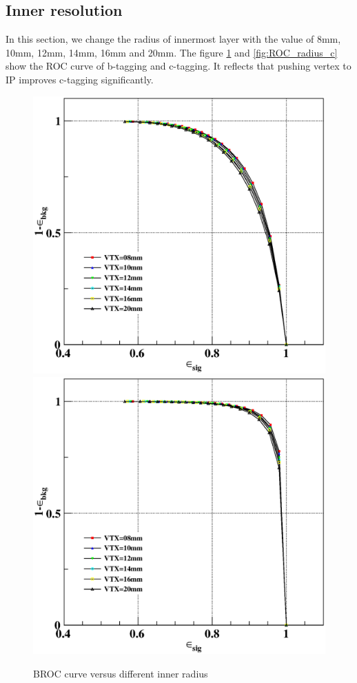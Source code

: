 \documentclass[usetikz]{style/cepcnote}
\begin{document}
\subsection{Inner resolution}

In this section, we change the radius of innermost layer with the value of 8mm, 10mm, 12mm, 14mm, 16mm and 20mm. 
The figure \ref{fig:ROC_radius_b} and \ref{fig:ROC_radius_c} show the ROC curve of b-tagging and c-tagging. It reflects that pushing vertex to IP improves c-tagging significantly.
\begin{figure}[!ht]
	\centering
	\includegraphics[scale=0.35]{figures/radius/plot6ROC-cbkg-bjet.eps}
	\includegraphics[scale=0.35]{figures/radius/plot6ROC-obkg-bjet.eps}
	\caption{BROC curve versus different inner radius }
	\label{fig:ROC_radius_b}
\end{figure}
\end{document}
